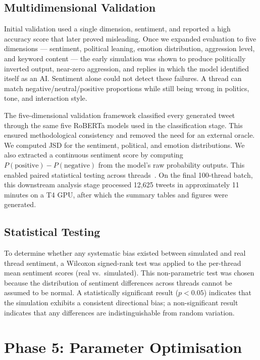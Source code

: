 \documentclass[logo,bsc,singlespacing,parskip,online]{infthesis}
\begin{document}
\subsection{Multidimensional Validation}

Initial validation used a single dimension, sentiment, and reported a high accuracy score that later proved misleading. Once we expanded evaluation to five dimensions --- sentiment, political leaning, emotion distribution, aggression level, and keyword content --- the early simulation was shown to produce politically inverted output, near-zero aggression, and replies in which the model identified itself as an AI. Sentiment alone could not detect these failures. A thread can match negative/neutral/positive proportions while still being wrong in politics, tone, and interaction style.

The five-dimensional validation framework classified every generated tweet through the same five RoBERTa models used in the classification stage. This ensured methodological consistency and removed the need for an external oracle. We computed JSD for the sentiment, political, and emotion distributions. We also extracted a continuous sentiment score by computing $P(\text{positive}) - P(\text{negative})$ from the model's raw probability outputs. This enabled paired statistical testing across threads~\citep{antypas2023negativity,tun2023sentiment}. On the final 100-thread batch, this downstream analysis stage processed 12,625 tweets in approximately 11 minutes on a T4 GPU, after which the summary tables and figures were generated.

\subsection{Statistical Testing}

To determine whether any systematic bias existed between simulated and real thread sentiment, a Wilcoxon signed-rank test was applied to the per-thread mean sentiment scores (real vs.\ simulated). This non-parametric test was chosen because the distribution of sentiment differences across threads cannot be assumed to be normal. A statistically significant result ($p < 0.05$) indicates that the simulation exhibits a consistent directional bias; a non-significant result indicates that any differences are indistinguishable from random variation.

\section{Phase 5: Parameter Optimisation}
\end{document}
